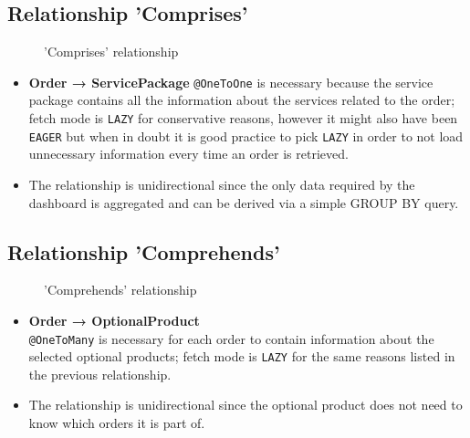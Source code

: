 \subsection*{Relationship 'Comprises'}

\begin{minipage}[h]{0.5\textwidth}
    \begin{figure}[H]
        
        \caption{'Comprises' relationship}
        \label{fig:orm_o_sp}
    \end{figure}
\end{minipage}
\hfill
\begin{minipage}[h]{0.48\textwidth}
    \begin{itemize}
        \item \textbf{Order → ServicePackage} \texttt{@OneToOne} is necessary because the service package contains all the information about the services related to the order; fetch mode is \texttt{LAZY} for conservative reasons, however it might also have been \texttt{EAGER} but when in doubt it is good practice to pick \texttt{LAZY} in order to not load unnecessary information every time an order is retrieved.
        \item The relationship is unidirectional since the only data required by the dashboard is aggregated and can be derived via a simple GROUP BY query.
    \end{itemize}
\end{minipage}

\subsection*{Relationship 'Comprehends'}

\begin{minipage}[h]{0.5\textwidth}
    \begin{figure}[H]
        
        \caption{'Comprehends' relationship}
        \label{fig:orm_o_sp}
    \end{figure}
\end{minipage}
\hfill
\begin{minipage}[h]{0.48\textwidth}
    \begin{itemize}
        \item \textbf{Order → OptionalProduct} \\ \texttt{@OneToMany} is necessary for each order to contain information about the selected optional products; fetch mode is \texttt{LAZY} for the same reasons listed in the previous relationship.
        \item The relationship is unidirectional since the optional product does not need to know which orders it is part of.
    \end{itemize}
\end{minipage}

